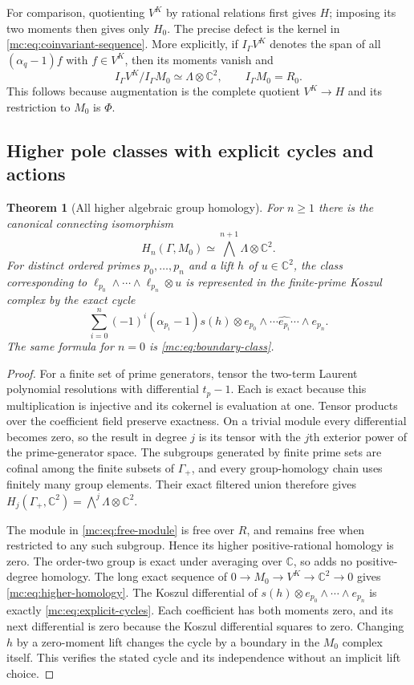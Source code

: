 \documentclass[11pt,a4paper]{article}
\newtheorem{theorem}{Theorem}[section]
\theoremstyle{definition}\newtheorem{definition}[theorem]{Definition}
\newcommand{\C}{\mathbb C}\newcommand{\R}{\mathbb R}
\begin{document}
For comparison, quotienting $V^K$ by rational relations first gives
$H$; imposing its two moments then gives only $H_0$. The precise
defect is the kernel in \eqref{mc:eq:coinvariant-sequence}. More
explicitly, if $I_\Gamma V^K$ denotes the span of all
$(\alpha_q-1)f$ with $f\in V^K$, then its moments vanish and
\[
 I_\Gamma V^K/I_\Gamma M_0\simeq\Lambda\otimes\C^2,
 \qquad I_\Gamma M_0=R_0.
 \tag{MC10}\label{mc:eq:order-defect}
\]
This follows because augmentation is the complete quotient
$V^K\to H$ and its restriction to $M_0$ is $\Phi$.

\subsection{Higher pole classes with explicit cycles and actions}

\begin{theorem}[All higher algebraic group homology]
\label{mc:thm:homology}
For $n\ge1$ there is the canonical connecting isomorphism
\[
 H_n(\Gamma,M_0)\simeq
       \bigwedge^{n+1}\Lambda\otimes\C^2.
 \tag{MC11}\label{mc:eq:higher-homology}
\]
For distinct ordered primes $p_0,\ldots,p_n$ and a lift $h$ of
$u\in\C^2$, the class corresponding to
$\ell_{p_0}\wedge\cdots\wedge\ell_{p_n}\otimes u$ is represented
in the finite-prime Koszul complex by the exact cycle
\[
 \sum_{i=0}^{n}(-1)^i(\alpha_{p_i}-1)s(h)
       \otimes e_{p_0}\wedge\cdots\widehat{e_{p_i}}
                                      \cdots\wedge e_{p_n}.
 \tag{MC12}\label{mc:eq:explicit-cycles}
\]
The same formula for $n=0$ is \eqref{mc:eq:boundary-class}.
\end{theorem}
\begin{proof}
For a finite set of prime generators, tensor the two-term Laurent
polynomial resolutions with differential $t_p-1$. Each is exact
because this multiplication is injective and its cokernel is
evaluation at one. Tensor products over the coefficient field
preserve exactness. On a trivial module every differential becomes
zero, so the result in degree $j$ is its tensor with the $j$th
exterior power of the prime-generator space. The subgroups generated
by finite prime sets are cofinal among the finite subsets of
$\Gamma_+$, and every group-homology chain uses finitely many group
elements. Their exact filtered union therefore gives
$H_j(\Gamma_+,\C^2)=\bigwedge^j\Lambda\otimes\C^2$.

The module in \eqref{mc:eq:free-module} is free over $R$, and remains
free when restricted to any such subgroup. Hence its higher
positive-rational homology is zero. The order-two group is exact
under averaging over $\C$, so adds no positive-degree homology.
The long exact sequence of
$0\to M_0\to V^K\to\C^2\to0$ gives
\eqref{mc:eq:higher-homology}. The Koszul differential of
$s(h)\otimes e_{p_0}\wedge\cdots\wedge e_{p_n}$ is exactly
\eqref{mc:eq:explicit-cycles}. Each coefficient has both moments zero,
and its next differential is zero because the Koszul differential
squares to zero. Changing $h$ by a zero-moment lift changes the
cycle by a boundary in the $M_0$ complex itself. This verifies the
stated cycle and its independence without an implicit lift choice.
\end{proof}
\end{document}
